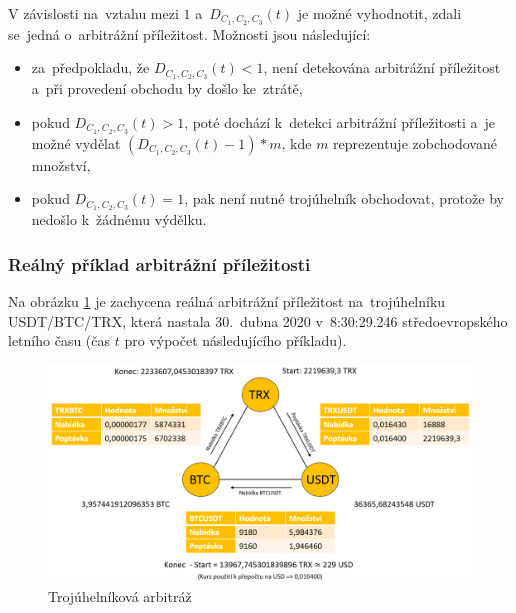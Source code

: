 \documentclass[thesis=B,czech]{FITthesis}[2019/03/21]
\begin{document}

V závislosti na~vztahu mezi \(1\) a~\(D_{C_1,C_2,C_3}(t)\) je možné vyhodnotit, zdali se~jedná o~arbitrážní příležitost. Možnosti jsou následující:
\begin{itemize}
    \item za~předpokladu, že \(D_{C_1,C_2,C_3}(t) < 1\), není detekována arbitrážní  \linebreak příležitost a~při provedení obchodu by došlo ke~ztrátě,
    \item pokud \(D_{C_1,C_2,C_3}(t) > 1\), poté dochází k~detekci arbitrážní příležitosti a~je možné vydělat \( (D_{C_1,C_2,C_3}(t) - 1) * m\), kde \(m\) reprezentuje zobchodované množství,
    \item pokud \(D_{C_1,C_2,C_3}(t) = 1\), pak není nutné trojúhelník obchodovat, protože by nedošlo k~žádnému výdělku.
\end{itemize}

\subsubsection{Reálný příklad arbitrážní příležitosti}
Na obrázku \ref{triangle_arbitrage} je zachycena reálná arbitrážní příležitost na~trojúhelníku USDT/BTC/TRX, která nastala 30.~dubna 2020 v~8:30:29.246  \linebreak středoevropského letního času (čas \(t\) pro výpočet následujícího příkladu). 

\begin{figure}\centering
	\includegraphics[width=1\textwidth]{images/triangle.png}
	\caption{Trojúhelníková arbitráž}\label{triangle_arbitrage}
\end{figure}

\end{document}
